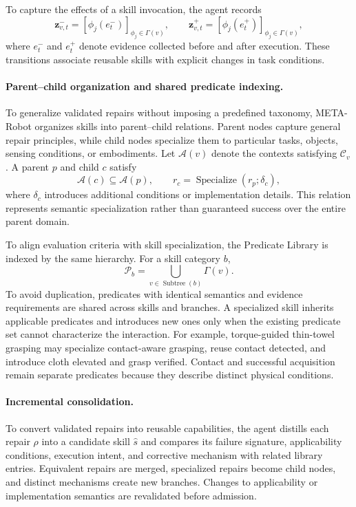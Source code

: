 \documentclass{article} %
\begin{document}
To capture the effects of a skill invocation, the agent records
\begin{equation}
\mathbf{z}_{v,t}^{-}
=
[\phi_j(e_t^{-})]_{\phi_j\in\Gamma(v)},
\qquad
\mathbf{z}_{v,t}^{+}
=
[\phi_j(e_t^{+})]_{\phi_j\in\Gamma(v)},
\label{eq:skill_predicate_transition}
\end{equation}
where $e_t^{-}$ and $e_t^{+}$ denote evidence collected before and after execution. These transitions associate reusable skills with explicit changes in task conditions.
\paragraph{Parent--child organization and shared predicate indexing.}
To generalize validated repairs without imposing a predefined taxonomy, META-Robot organizes skills into parent--child relations. Parent nodes capture general repair principles, while child nodes specialize them to particular tasks, objects, sensing conditions, or embodiments. Let $\mathcal{A}(v)$ denote the contexts satisfying $\mathcal{C}_v$. A parent $p$ and child $c$ satisfy
\begin{equation}
\mathcal{A}(c)\subseteq\mathcal{A}(p),
\qquad
r_c=\operatorname{Specialize}(r_p;\delta_c),
\label{eq:skill_specialization}
\end{equation}
where $\delta_c$ introduces additional conditions or implementation details. This relation represents semantic specialization rather than guaranteed success over the entire parent domain.

To align evaluation criteria with skill specialization, the Predicate Library is indexed by the same hierarchy. For a skill category $b$,
\begin{equation}
\mathcal{P}_{b}
=
\bigcup_{v\in\operatorname{Subtree}(b)}\Gamma(v).
\label{eq:predicate_category}
\end{equation}
To avoid duplication, predicates with identical semantics and evidence requirements are shared across skills and branches. A specialized skill inherits applicable predicates and introduces new ones only when the existing predicate set cannot characterize the interaction. For example, torque-guided thin-towel grasping may specialize contact-aware grasping, reuse contact detected, and introduce cloth elevated and grasp verified. Contact and successful acquisition remain separate predicates because they describe distinct physical conditions.
\paragraph{Incremental consolidation.}
To convert validated repairs into reusable capabilities, the agent distills each repair $\rho$ into a candidate skill $\hat{s}$ and compares its failure signature, applicability conditions, execution intent, and corrective mechanism with related library entries. Equivalent repairs are merged, specialized repairs become child nodes, and distinct mechanisms create new branches. Changes to applicability or implementation semantics are revalidated before admission.
\end{document}
